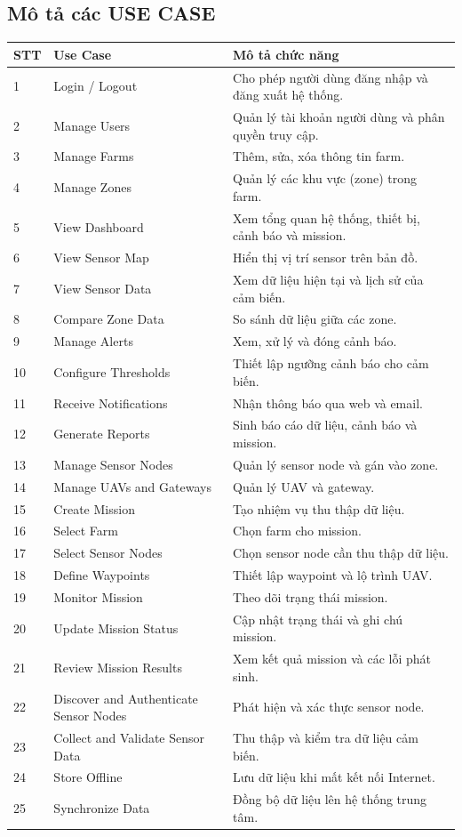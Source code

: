 \subsection{Mô tả các USE CASE}
\begin{longtable}{p{}p{}p{}}
\toprule
\textbf{STT} & \textbf{Use Case} & \textbf{Mô tả chức năng} \\
\midrule
1 & Login / Logout & Cho phép người dùng đăng nhập và đăng xuất hệ thống. \\
2 & Manage Users & Quản lý tài khoản người dùng và phân quyền truy cập.  \\
3 & Manage Farms & Thêm, sửa, xóa thông tin farm. \\
4 & Manage Zones & Quản lý các khu vực (zone) trong farm. \\
5 & View Dashboard & Xem tổng quan hệ thống, thiết bị, cảnh báo và mission. \\
6 & View Sensor Map & Hiển thị vị trí sensor trên bản đồ. \\
7 & View Sensor Data & Xem dữ liệu hiện tại và lịch sử của cảm biến. \\
8 & Compare Zone Data & So sánh dữ liệu giữa các zone. \\
9 & Manage Alerts & Xem, xử lý và đóng cảnh báo. \\
10 & Configure Thresholds & Thiết lập ngưỡng cảnh báo cho cảm biến. \\
11 & Receive Notifications & Nhận thông báo qua web và email. \\
12 & Generate Reports & Sinh báo cáo dữ liệu, cảnh báo và mission. \\
13 & Manage Sensor Nodes & Quản lý sensor node và gán vào zone. \\
14 & Manage UAVs and Gateways & Quản lý UAV và gateway. \\
15 & Create Mission & Tạo nhiệm vụ thu thập dữ liệu. \\
16 & Select Farm & Chọn farm cho mission. \\
17 & Select Sensor Nodes & Chọn sensor node cần thu thập dữ liệu. \\
18 & Define Waypoints & Thiết lập waypoint và lộ trình UAV. \\
19 & Monitor Mission & Theo dõi trạng thái mission. \\
20 & Update Mission Status & Cập nhật trạng thái và ghi chú mission. \\
21 & Review Mission Results & Xem kết quả mission và các lỗi phát sinh. \\
22 & Discover and Authenticate Sensor Nodes & Phát hiện và xác thực sensor node. \\
23 & Collect and Validate Sensor Data & Thu thập và kiểm tra dữ liệu cảm biến. \\
24 & Store Offline & Lưu dữ liệu khi mất kết nối Internet. \\
25 & Synchronize Data & Đồng bộ dữ liệu lên hệ thống trung tâm. \\
\bottomrule
\end{longtable}

